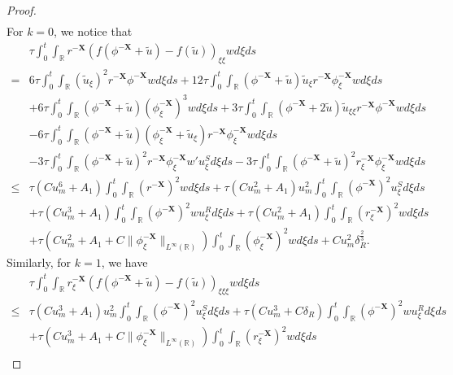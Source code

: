 \documentclass[10pt,reqno]{amsart}
\numberwithin{equation}{section}
\begin{document}
\begin{proof}
\begin{align*}
		\end{align*}
		For $k=0$, we notice that 
		\begin{align*}
			&\tau\int_0^t\int_{\mathbb{R}}r^{-\mathbf{X}}\left(f(\phi^{-\mathbf{X}}+\tilde{u})-f(\tilde{u})\right)_{\xi\xi}wd\xi ds\\
			=&6\tau\int_0^t\int_{\mathbb{R}}(\tilde{u}_{\xi})^2r^{-\mathbf{X}}\phi^{-\mathbf{X}}wd\xi ds+12\tau\int_{0}^t\int_{\mathbb{R}}(\phi^{-\mathbf{X}}+\tilde{u})\tilde{u}_{\xi}r^{-\mathbf{X}}\phi^{-\mathbf{X}}_{\xi}wd\xi ds\\
			&+6\tau\int_{0}^t\int_{\mathbb{R}}(\phi^{-\mathbf{X}}+\tilde{u})(\phi^{-\mathbf{X}}_{\xi})^3wd\xi ds+3\tau\int_{0}^t\int_{\mathbb{R}}(\phi^{-\mathbf{X}}+2\tilde{u})\tilde{u}_{\xi\xi}r^{-\mathbf{X}}\phi^{-\mathbf{X}}wd\xi ds\\
			&-6\tau\int_{0}^t\int_{\mathbb{R}}(\phi^{-\mathbf{X}}+\tilde{u})(\phi_{\xi}^{-\mathbf{X}}+\tilde{u}_{\xi})r^{-\mathbf{X}}\phi_{\xi}^{-\mathbf{X}}wd\xi ds\\
			&-3\tau\int_{0}^t\int_{\mathbb{R}}(\phi^{-\mathbf{X}}+\tilde{u})^2r^{-\mathbf{X}}\phi_{\xi}^{-\mathbf{X}}w'u_{\xi}^Sd\xi ds-3\tau\int_{0}^t\int_{\mathbb{R}}(\phi^{-\mathbf{X}}+\tilde{u})^2r_{\xi}^{-\mathbf{X}}\phi_{\xi}^{-\mathbf{X}}wd\xi ds\\
			\leq& \tau(Cu_m^6+A_1)\int_0^t\int_{\mathbb{R}}(r^{-\mathbf{X}})^2wd\xi ds+\tau(Cu_m^2+A_1)u_m^2\int_0^t\int_{\mathbb{R}}(\phi^{-\mathbf{X}})^2u^S_{\xi}d\xi ds\\
			&+\tau(Cu_m^3+A_1)\int_0^t\int_{\mathbb{R}}(\phi^{-\mathbf{X}})^2wu^R_{\xi}d\xi ds+\tau(Cu_m^2+A_1)\int_0^t\int_{\mathbb{R}}(r_{\xi}^{-\mathbf{X}})^2wd\xi ds\\
			&+\tau\left(Cu_m^2+A_1+C\|\phi_{\xi}^{-\mathbf{X}}\|_{L^{\infty}(\mathbb{R})}\right)\int_0^t\int_{\mathbb{R}}(\phi_{\xi}^{-\mathbf{X}})^2wd\xi ds+Cu_m^2\delta_R^{\frac{2}{3}}.
		\end{align*}
		Similarly, for $k=1$, we have
		\begin{align*}
			&\tau\int_0^t\int_{\mathbb{R}}r_{\xi}^{-\mathbf{X}}\left(f(\phi^{-\mathbf{X}}+\tilde{u})-f(\tilde{u})\right)_{\xi\xi\xi}wd\xi ds\\
			\leq&\tau(Cu_m^3+A_1)u_m^2\int_0^t\int_{\mathbb{R}}(\phi^{-\mathbf{X}})^2u^S_{\xi}d\xi ds+\tau\left(Cu_m^3+C\delta_R\right)\int_0^t\int_{\mathbb{R}}(\phi^{-\mathbf{X}})^2wu^R_{\xi}d\xi ds\\
			&+\tau\left(Cu_m^3+A_1+C\|\phi_{\xi}^{-\mathbf{X}}\|_{L^{\infty}(\mathbb{R})}\right)\int_0^t\int_{\mathbb{R}}(r_{\xi}^{-\mathbf{X}})^2wd\xi ds\\

\end{align*}
\end{proof}
\end{document}
